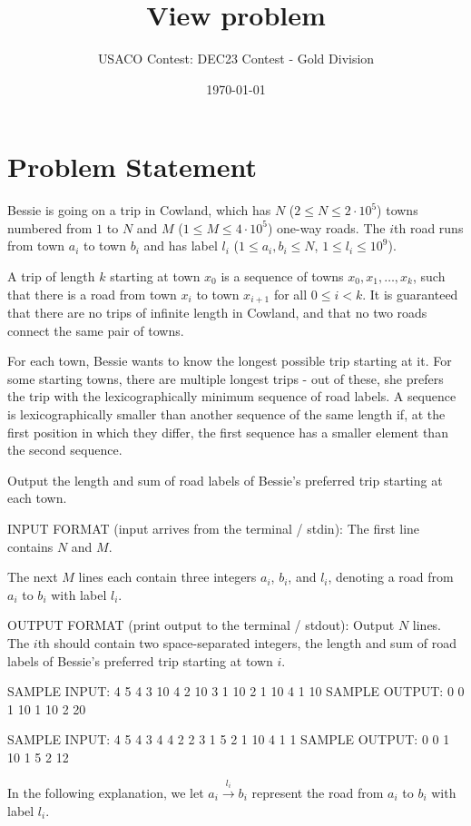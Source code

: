 \documentclass[12pt]{article}
\title{View problem}
\author{USACO Contest: DEC23 Contest - Gold Division}
\date{\today}
\begin{document}
\maketitle

\section*{Problem Statement}


Bessie is going on a trip in Cowland, which has $N$ ($2\le N\le 2\cdot 10^5$)
towns numbered from $1$ to $N$ and $M$ ($1\le M\le 4\cdot 10^5$) one-way roads.
The $i$th road runs from town $a_i$ to town $b_i$ and has label $l_i$
($1\le a_i,b_i\le N$, $1\le l_i\le 10^9$).  

A trip of length $k$ starting at town $x_0$ is a sequence of towns
$x_0, x_1, \ldots, x_k$, such that there is a road from town $x_i$ to town
$x_{i+1}$ for all $0\le i < k$. It is guaranteed that there are no trips of
infinite length in Cowland, and that no two roads connect the same pair of
towns.

For each town, Bessie wants to know the longest possible trip starting at it.
For some starting towns, there are multiple longest trips - out of these, she
prefers the trip with the lexicographically minimum sequence of road labels.  A
sequence is lexicographically smaller than another sequence of the same length
if, at the first position in which they differ, the first sequence has a smaller
element than the second sequence.

Output the length and sum of road labels of Bessie's preferred trip starting at
each town.

INPUT FORMAT (input arrives from the terminal / stdin):
The first line contains $N$ and $M$.

The next $M$ lines each contain three integers $a_i$, $b_i$, and $l_i$, denoting
a road from $a_i$ to $b_i$ with label $l_i$.

OUTPUT FORMAT (print output to the terminal / stdout):
Output $N$ lines. The $i$th should contain two space-separated integers, the
length and sum of road labels of Bessie's preferred trip starting at town
$i$.


SAMPLE INPUT:
4 5
4 3 10
4 2 10
3 1 10
2 1 10
4 1 10
SAMPLE OUTPUT: 
0 0
1 10
1 10
2 20

SAMPLE INPUT:
4 5
4 3 4
4 2 2
3 1 5
2 1 10
4 1 1
SAMPLE OUTPUT: 
0 0
1 10
1 5
2 12

In the following explanation, we let $a_i\overset{l_i}\to b_i$ represent the
road from $a_i$ to $b_i$ with label $l_i$.
\end{document}
